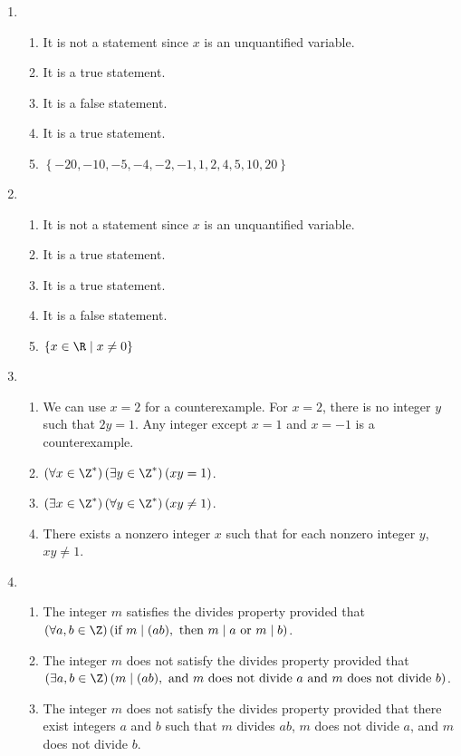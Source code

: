 \begin{enumerate}
\item \begin{enumerate}
\item It is not a statement since $x$ is an unquantified variable.
\item It is a true statement.
\item It is a false statement.
\item It is a true statement.
\item $\left\{ -20, -10, -5, -4, -2, -1, 1, 2, 4, 5, 10, 20 \right\}$
\end{enumerate}


\item \begin{enumerate}
\item It is not a statement since $x$ is an unquantified variable.
\item It is a true statement.
\item It is a true statement.
\item It is a false statement.
\item $\left\{ x \in \R \mid x \ne 0 \right\}$
\end{enumerate}



\item \begin{enumerate}
\item We can use $x = 2$ for a counterexample.  For $x = 2$, there is no integer $y$ such that $2y = 1$.  Any integer except $x = 1$ and $x = -1$ is a counterexample.
\item $\left( \forall x \in \Z^* \right) \left( \exists y \in \Z^* \right) (xy = 1)$.
\item $\left( \exists x \in \Z^* \right) \left( \forall y \in \Z^* \right) (xy \ne 1)$.
\item There exists a nonzero integer $x$ such that for each nonzero integer $y$, $xy \ne 1$.
\end{enumerate}


\item \begin{enumerate}
\item The integer $m$ satisfies the divides property provided that \\$\left( \forall a, b \in \Z \right) \left( \text{if } m \mid (ab), \text{ then } m \mid a \text{ or } m \mid b \right)$.
\item The integer $m$ does not satisfy the divides property provided that \\$\left( \exists a, b \in \Z \right) \left(  m \mid (ab), \text{ and } m \text{ does not divide } a \text{ and } m \text{ does not divide } b \right)$.
\item The integer $m$ does not satisfy the divides property provided that there exist integers $a$ and $b$ such that $m$ divides $ab$, $m$ does not divide $a$, and $m$ does not divide $b$.
\end{enumerate}




\end{enumerate}
